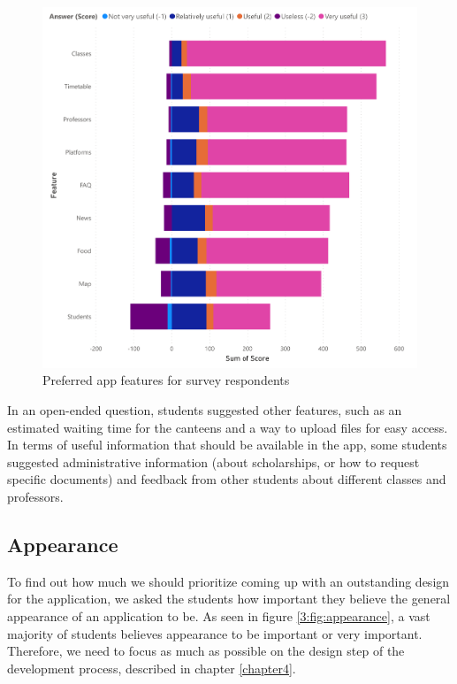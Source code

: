 \begin{figure}[ht]
    \centering
         \includegraphics[height=0.57\textheight]{figures/charts/survey/features.pdf}
    \caption{Preferred app features for survey respondents}
    \label{3:fig:features}
\end{figure}

In an open-ended question, students suggested other features, such as an estimated waiting time for the canteens and a way to upload files for easy access. In terms of useful information that should be available in the app, some students suggested administrative information (about scholarships, or how to request specific documents) and feedback from other students about different classes and professors.

\subsection{Appearance} \label{3:appearance}

To find out how much we should prioritize coming up with an outstanding design for the application, we asked the students how important they believe the general appearance of an application to be. As seen in figure \ref{3:fig:appearance}, a vast majority of students believes appearance to be important or very important. Therefore, we need to focus as much as possible on the design step of the development process, described in chapter \ref{chapter4}.

